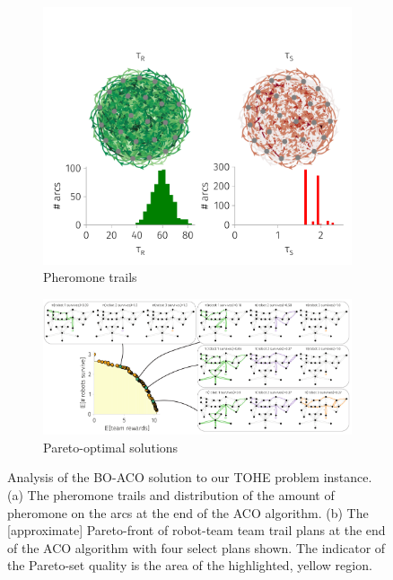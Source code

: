 \documentclass[11pt, oneside]{article}
\begin{document}
\begin{figure}[h!]
    \centering
    \begin{subfigure}[b]{0.59\textwidth}
    	\includegraphics[width=\textwidth]{pheremone.pdf}
	\caption{Pheromone trails} \label{fig:pheromone}
    \end{subfigure}
        \begin{subfigure}[b]{\textwidth}
    	\includegraphics[width=\textwidth]{real_pareto_front.pdf}
	\caption{Pareto-optimal solutions} \label{fig:pareto_front}
    \end{subfigure}
    \caption{Analysis of the BO-ACO solution to our TOHE problem instance. 
    (a) The pheromone trails and distribution of the amount of pheromone on the arcs at the end of the ACO algorithm. 
    (b) The [approximate] Pareto-front of robot-team team trail plans at the end of the ACO algorithm with four select plans shown. The indicator of the Pareto-set quality is the area of the highlighted, yellow region.
    }
\end{figure}
\end{document}
